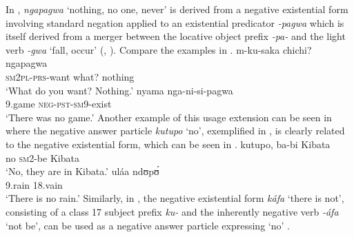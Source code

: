\documentclass[output=paper]{langsci/langscibook}
\begin{document}
In , \textit{ngapagwa} `nothing, no one, never' is derived from a
negative existential form involving standard negation applied to an
existential predicator \textit{-pagwa} which is itself derived from a
merger between the locative object prefix \textit{-pa-} and the light verb
\textit{-gwa} `fall, occur' (\citealt[72]{Sanderson1922},
\citealt[174]{Whiteley1966}). Compare the examples in
.
%
\ea\label{ex:yao-want-game} 
\ea\gll m-ku-saka chichi? ngapagwa\\
\textsc{sm2pl-prs}-want what? nothing\\ \glt 	`What do you want?
Nothing.' \ex\gll nyama nga-ni-si-pagwa\\ 9.game
\textsc{neg-pst-sm}9-exist\\ \glt 	`There was no game.' \z\z 
%
Another
example of this usage extension can be seen in  where the
negative answer particle \textit{kutupo} `no', exemplified in
, is clearly related to the negative existential
form, which can be seen in .
\ea\label{ex:matumbi-kibata-rain} 
\ea\label{ex:matumbi-kibata} \gll kutupo, ba-bi Kibata\\ no \textsc{sm}2-be
Kibata\\ \glt 	`No, they are in Kibata.' \ex\label{ex:matumbi-rain} \gll
ul{\'a}a ndʊp{\'ʊ}\\ 9.rain 18.vain\\ \glt 	`There is no rain.' \z\z
Similarly, in , the negative existential form \textit{k{\'a}fa}
`there is not', consisting of a class 17 subject prefix \textit{ku-} and
the inherently negative verb \textit{-áfa} `not be', can be used as a negative
answer particle expressing `no' \citep[30]{Meeussen1952}.
\end{document}
